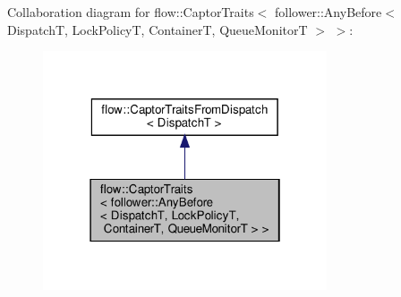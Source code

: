 Collaboration diagram for flow\+:\+:Captor\+Traits$<$ follower\+:\+:Any\+Before$<$ DispatchT, Lock\+PolicyT, ContainerT, Queue\+MonitorT $>$ $>$\+:
\nopagebreak
\begin{figure}[H]
\begin{center}
\leavevmode
\includegraphics[width=238pt]{structflow_1_1_captor_traits_3_01follower_1_1_any_before_3_01_dispatch_t_00_01_lock_policy_t_00_c5983590e4e1ce28049543603e568672}
\end{center}
\end{figure}
